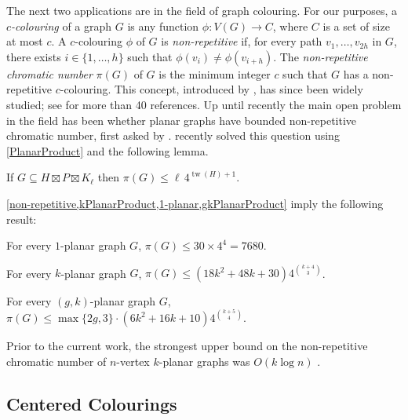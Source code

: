 \documentclass{patmorin}
\DeclareMathOperator{\tw}{tw}
\renewcommand{\le}{\leqslant}
\begin{document}
The next two applications are in the field of graph colouring. For our purposes, a \emph{$c$-colouring} of a graph $G$ is any function $\phi\colon V(G)\to C$, where $C$ is a set of size at most $c$.
A $c$-colouring $\phi$ of $G$ is \emph{non-repetitive} if, for every path $v_1,\ldots,v_{2h}$ in $G$, there exists $i\in\{1,\ldots,h\}$ such that $\phi(v_i)\neq\phi(v_{i+h})$.  The \emph{non-repetitive chromatic number} $\pi(G)$ of $G$ is the minimum integer $c$ such that $G$ has a non-repetitive $c$-colouring. This concept, introduced by \citet{AGHR-RSA02}, has since been widely studied; see \citep{dujmovic.esperet.ea:planar} for more than 40 references. Up until recently the main open problem in the field has been whether planar graphs have bounded non-repetitive chromatic number, first asked by \citet{AGHR-RSA02}. \citet{dujmovic.esperet.ea:planar} recently solved this question using \cref{PlanarProduct} and the following lemma.

\begin{lem}
\label{non-repetitive}
If $G\subseteq H\boxtimes P \boxtimes K_\ell$ then $\pi(G)\le \ell\, 4^{\tw(H)+1}$.
\end{lem}

\cref{non-repetitive,kPlanarProduct,1-planar,gkPlanarProduct} imply the following result:

\pagebreak

\begin{cor}\quad
\begin{compactitem}
\item	For every $1$-planar graph $G$, $\pi(G)\le 30\times 4^4=7680$.
\item For every $k$-planar graph $G$,
	$\pi(G)\le (18k^2+48k+30) 4^{\binom{k+4}{3}}$.
\item	For every $(g,k)$-planar graph $G$,
	$  \pi(G)\le \max\{2g,3\}\cdot(6k^2+16k+10) 4^{\binom{k+5}{4}}.$
\end{compactitem}
\end{cor}

Prior to the current work, the strongest upper bound on the non-repetitive chromatic number of $n$-vertex  $k$-planar graphs was $O(k\log n)$ \cite{dujmovic.morin.ea:layered}.

\subsection{Centered Colourings}
\end{document}
